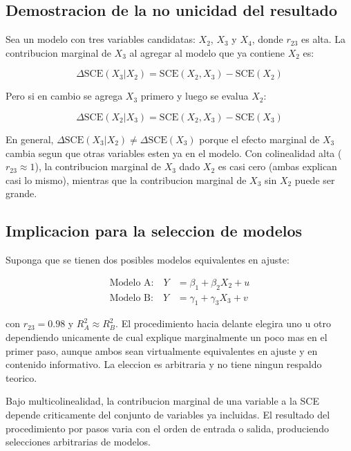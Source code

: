 \documentclass[12pt, letterpaper]{article}
\theoremstyle{remark}
\begin{document}
\subsection{Demostracion de la no unicidad del resultado}

Sea un modelo con tres variables candidatas: $X_2$, $X_3$ y $X_4$, donde
$r_{23}$ es alta. La contribucion marginal de $X_3$ al agregar al modelo
que ya contiene $X_2$ es:

\begin{equation}
  \Delta\text{SCE}(X_3 | X_2)
    = \text{SCE}(X_2, X_3) - \text{SCE}(X_2)
  \label{eq:delta_SCE_cond}
\end{equation}

Pero si en cambio se agrega $X_3$ primero y luego se evalua $X_2$:

\begin{equation}
  \Delta\text{SCE}(X_2 | X_3)
    = \text{SCE}(X_2, X_3) - \text{SCE}(X_3)
  \label{eq:delta_SCE_cond2}
\end{equation}

En general, $\Delta\text{SCE}(X_3 | X_2) \neq \Delta\text{SCE}(X_3)$
porque el efecto marginal de $X_3$ cambia segun que otras variables esten
ya en el modelo. Con colinealidad alta ($r_{23} \approx 1$), la contribucion
marginal de $X_3$ dado $X_2$ es casi cero (ambas explican casi lo mismo),
mientras que la contribucion marginal de $X_3$ sin $X_2$ puede ser grande.

\subsection{Implicacion para la seleccion de modelos}

Suponga que se tienen dos posibles modelos equivalentes en ajuste:

\begin{align}
  \text{Modelo A:} \quad Y &= \beta_1 + \beta_2 X_2 + u \\
  \text{Modelo B:} \quad Y &= \gamma_1 + \gamma_3 X_3 + v
\end{align}

con $r_{23} = 0.98$ y $R^2_A \approx R^2_B$. El procedimiento hacia delante
elegira uno u otro dependiendo unicamente de cual explique marginalmente
un poco mas en el primer paso, aunque ambos sean virtualmente equivalentes
en ajuste y en contenido informativo. La eleccion es arbitraria y no tiene
ningun respaldo teorico.

\begin{clave}
  Bajo multicolinealidad, la contribucion marginal de una variable a la
  SCE depende criticamente del conjunto de variables ya incluidas. El resultado
  del procedimiento por pasos varia con el orden de entrada o salida,
  produciendo selecciones arbitrarias de modelos.
\end{clave}
\end{document}
